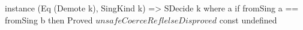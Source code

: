 \begin{code}
instance (Eq (Demote k), SingKind k)
      => SDecide k where
  a %
    if fromSing a == fromSing b
       then Proved $ unsafeCoerce Refl
       else Disproved $ const undefined
\end{code}
